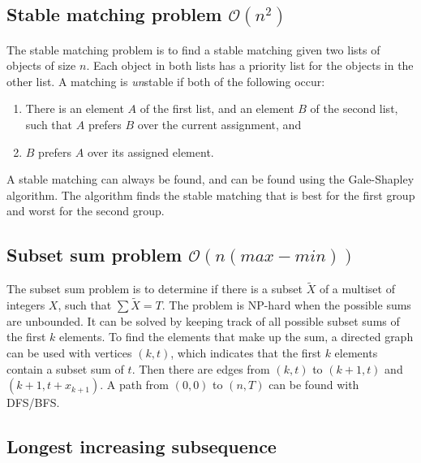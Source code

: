 


\subsection{Stable matching problem $\mathcal O(n^2)$}

The stable matching problem is to find a stable matching given two lists of objects of size $n$. Each object in both lists has a priority list for the objects in the other list. A matching is \textit{un}stable if both of the following occur:
\begin{enumerate}
    \item There is an element $A$ of the first list, and an element $B$ of the second list, such that $A$ prefers $B$ over the current assignment, and
    \item $B$ prefers $A$ over its assigned element.
\end{enumerate}
A stable matching can always be found, and can be found using the Gale-Shapley algorithm. The algorithm finds the stable matching that is best for the first group and worst for the second group.



\subsection{Subset sum problem $\mathcal O(n(max - min))$}

The subset sum problem is to determine if there is a subset $\tilde X$ of a multiset of integers $X$, such that $\sum \tilde X = T$. The problem is NP-hard when the possible sums are unbounded. It can be solved by keeping track of all possible subset sums of the first $k$ elements. To find the elements that make up the sum, a directed graph can be used with vertices $(k, t)$, which indicates that the first $k$ elements contain a subset sum of $t$. Then there are edges from $(k, t)$ to $(k + 1, t)$ and $(k + 1, t + x_{k + 1})$. A path from $(0, 0)$ to $(n, T)$ can be found with DFS/BFS.



\subsection{Longest increasing subsequence}






